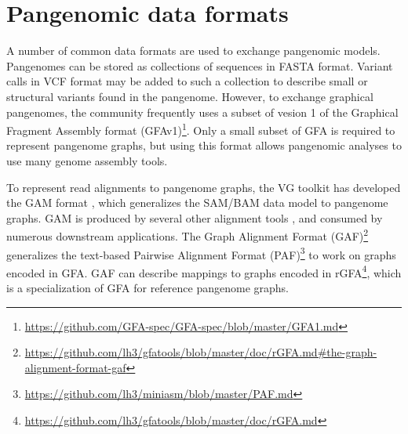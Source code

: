 \section{Pangenomic data formats}
\label{sec:formats}

A number of common data formats are used to exchange pangenomic models.
Pangenomes can be stored as collections of sequences in FASTA format.
Variant calls in VCF format \cite{danecek2011variant} may be added to such a collection to describe small or structural variants found in the pangenome.
However, to exchange graphical pangenomes, the community frequently uses a subset of vesion 1 of the Graphical Fragment Assembly format (GFAv1)\footnote{\url{https://github.com/GFA-spec/GFA-spec/blob/master/GFA1.md}}.
Only a small subset of GFA is required to represent pangenome graphs, but using this format allows pangenomic analyses to use many genome assembly tools.

To represent read alignments to pangenome graphs, the \textsc{VG} toolkit has developed the GAM format \cite{Garrison_2018}, which generalizes the SAM/BAM \cite{Li_2009} data model to pangenome graphs.
GAM is produced by several other alignment tools \cite{Rautiainen_2019b,Jain_2019a}, and consumed by numerous downstream applications.
The Graph Alignment Format (GAF)\footnote{\url{https://github.com/lh3/gfatools/blob/master/doc/rGFA.md\#the-graph-alignment-format-gaf}} generalizes the text-based Pairwise Alignment Format (PAF)\footnote{\url{https://github.com/lh3/miniasm/blob/master/PAF.md}} to work on graphs encoded in GFA.
GAF can describe mappings to graphs encoded in rGFA\footnote{\url{https://github.com/lh3/gfatools/blob/master/doc/rGFA.md}}, which is a specialization of GFA for reference pangenome graphs.
